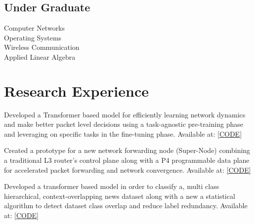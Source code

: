 \documentclass[]{onepage}
\begin{document}
\begin{minipage}[t]{0.33\textwidth}
\subsection{Under Graduate}
Computer Networks \\
Operating Systems \\
Wireless Communication \\
Applied Linear Algebra \\

%
%

\end{minipage} 
\hfill
\begin{minipage}[t]{0.66\textwidth} 


\section{Research Experience}

Developed a Transformer based model for efficiently learning network dynamics and make better packet level decisions using a task-agnostic pre-training phase and leveraging on specific tasks in the fine-tuning phase. Available at: {\href{https://github.com/Siddhant-Ray/Network-Traffic-Transformer}{[CODE]}}
\smallsectionsep

Created a prototype for a new network forwarding node (Super-Node) combining a traditional L3 router's control plane along with a P4 programmable data plane for accelerated packet forwarding and network convergence. Available at: {\href{https://github.com/Siddhant-Ray/FRR-P4-Super-Node-Prototype}{[CODE]}}
\smallsectionsep

Developed a transformer based model in order to classify a, multi class hierarchical, context-overlapping news dataset along with a new a statistical algorithm to detect dataset class overlap and reduce label redundancy. Available at: {\href{https://github.com/Siddhant-Ray/Attentive-neural-networks-for-news-classification}{[CODE]}}
\smallsectionsep


\end{minipage}
\end{document}
